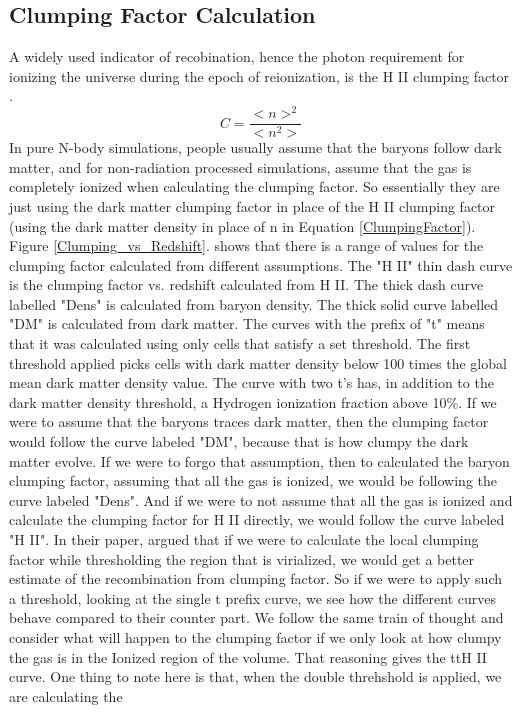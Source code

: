 
\subsection{Clumping Factor Calculation}

A widely used indicator of recobination, hence the photon requirement for ionizing the universe during the epoch of reionization, is the H {\footnotesize II} clumping factor \citep{ValageasSilk1999b}.  
\begin{equation}
\label{ClumpingFactor}
C = \frac{<n>^2}{<n^2>}
\end{equation}
In pure N-body simulations, people usually assume that the baryons follow dark matter, and for non-radiation processed simulations, assume that the gas is completely ionized when calculating the clumping factor\citep{LoebBarkana2001}.  So essentially they are just using the dark matter clumping factor in place of the H {\footnotesize II} clumping factor (using the dark matter density in place of n in Equation \ref{ClumpingFactor}).  Figure \ref{Clumping_vs_Redshift}.  shows that there is a range of values for the clumping factor calculated from different assumptions.  The "H {\footnotesize II}" thin dash curve is the clumping factor vs. redshift calculated from H {\footnotesize II}.  The thick dash curve labelled "Dens" is calculated from baryon density.  The thick solid curve labelled "DM" is calculated from dark matter. The curves with the prefix of "t" means that it was calculated using  only cells that satisfy a set threshold. The first threshold applied picks cells with dark matter density below 100 times the global mean dark matter density value.  The curve with two t's has, in addition to the dark matter density threshold, a Hydrogen ionization fraction above 10\%.  If we were to assume that the baryons traces dark matter, then the clumping factor would follow the curve labeled "DM", because that is how clumpy the dark matter evolve.  If we were to forgo that assumption, then to calculated the baryon clumping factor, assuming that all the gas is ionized, we would be following the curve labeled "Dens".  And if we were to not assume that all the gas is ionized and calculate the clumping factor for H {\footnotesize II} directly, we would follow the curve labeled "H {\footnotesize II}".  In their paper, \citep{RaicevicTheuns2011} argued that if we were to calculate the local clumping factor while thresholding the region that is virialized, we would get a better estimate of the recombination from clumping factor.  So if we were to apply such a threshold, looking at the single t prefix curve, we see how the different curves behave compared to their counter part.  We follow the same train of thought and consider what will happen to the clumping factor if we only look at how clumpy the gas is in the Ionized region of the volume.  That reasoning gives the ttH {\footnotesize II} curve.  One thing to note here is that, when the double threhshold is applied, we are calculating the 